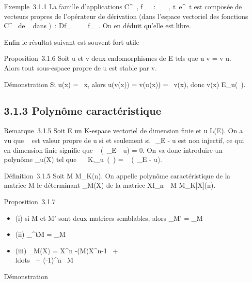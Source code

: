 \documentclass[]{article}
\begin{document}
Exemple~3.1.1 La famille d'applications C^\infty~, f_\lambda~ : ~
\rightarrow~ , t\mapsto~e^\lambda~t est composée de
vecteurs propres de l'opérateur de dérivation (dans l'espace vectoriel
des fonctions C^\infty~ de ~ dans )~: Df_\lambda~ =
\lambda~f_\lambda~. On en déduit qu'elle est libre.

Enfin le résultat suivant est souvent fort utile

Proposition~3.1.6 Soit u et v deux endomorphismes de E tels que u \cdot v =
v \cdot u. Alors tout sous-espace propre de u est stable par v.

Démonstration Si u(x) = \lambda~x, alors u(v(x)) = v(u(x)) = \lambda~v(x), donc v(x) \in
E_u(\lambda~).

\subsection{3.1.3 Polynôme caractéristique}

Remarque~3.1.5 Soit E un K-espace vectoriel de dimension finie et u \in
L(E). On a vu que \lambda~ est valeur propre de u si et seulement si
\lambda~\mathrmId_E - u est non injectif, ce qui en
dimension finie signifie que
~
(\lambda~\mathrmId_E - u) = 0. On va donc
introduire un polynôme \chi_u(X) tel que
\forall~\lambda~ \in K,\chi_u~(\lambda~)
= ~
(\lambda~\mathrmId_E - u).

Définition~3.1.5 Soit M \in M_K(n). On appelle polynôme
caractéristique de la matrice M le déterminant \chi_M(X) de la
matrice XI_n - M \in M_K[X](n).

Proposition~3.1.7

\begin{itemize}
\itemsep1pt\parskip0pt
\item
  (i) si M et M' sont deux matrices semblables, alors \chi_M' =
  \chi_M
\item
  (ii) \chi_^tM = \chi_M
\item
  (iii) \chi_M(X) = X^n
  -(M)X^n-1~
  + \\ldots~ +
  (-1)^n\
   M
\end{itemize}

Démonstration
\end{document}
